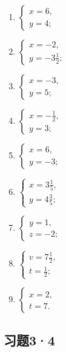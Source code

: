 \begin{enumerate}[start=5]
\item
  \(\left\{\begin{aligned}x=6,\\ y=4;\end{aligned}\right.\)
\item
  \(\left\{\begin{aligned}x=-2,\\ y=-3\frac{1}{2};\end{aligned}\right.\)
\item
  \(\left\{\begin{aligned}x=-3,\\ y=5;\end{aligned}\right.\)
\item
  \(\left\{\begin{aligned}x=-\frac{1}{2},\\ y=3;\end{aligned}\right.\)
\item
  \(\left\{\begin{aligned}x=6,\\ y=-3;\end{aligned}\right.\)
\item
  \(\left\{ \begin{array}{l} x = 3\frac{1}{5}, \\ y = 4\frac{3}{5}; \end{array} \right.\)
\item
  \(\left\{ \begin{array}{l} y = 1, \\ z = -2; \end{array} \right.\)
\item
  \(\left\{ \begin{array}{l} v = 7\frac{1}{2}, \\ t = \frac{1}{2}; \end{array} \right.\)
\item
  \(\left\{ \begin{array}{l} x = 2, \\ t = 7. \end{array} \right.\)
\end{enumerate}

\subsection{习题3·4}

